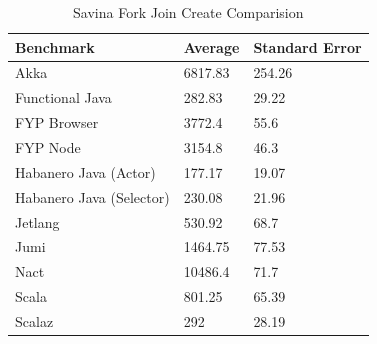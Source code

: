 \documentclass[oneside]{um-fict}
\begin{document}
\begin{table}[H]
    \begin{center}
        \begin{tabular}{|l|ll|}
        \hline
        Benchmark                & Average & Standard Error \\ \hline
        Akka                     & 6817.83 & 254.26         \\
        Functional Java          & 282.83  & 29.22          \\
        FYP Browser              & 3772.4  & 55.6           \\
        FYP Node                 & 3154.8  & 46.3           \\
        Habanero Java (Actor)    & 177.17  & 19.07          \\
        Habanero Java (Selector) & 230.08  & 21.96          \\
        Jetlang                  & 530.92  & 68.7           \\
        Jumi                     & 1464.75 & 77.53          \\
        Nact                     & 10486.4 & 71.7           \\
        Scala                    & 801.25  & 65.39          \\
        Scalaz                   & 292     & 28.19          \\ \hline
        \end{tabular}
        \caption{Savina Fork Join Create Comparision}\label{tab:savinafjcreate}
    \end{center}
\end{table}
\end{document}
